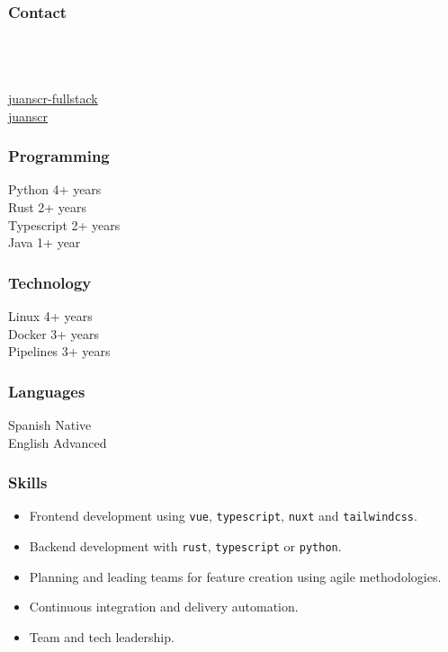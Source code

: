 \documentclass[11pt,a4paper]{article}
\begin{document}
{
%
\sloppy
%
\subsubsection*{Contact}
%
{\Large\faPhone} \myphone \vspace{0.3cm} \\
%
{\Large\faHome} \myhome \vspace{0.3cm} \\
%
{\Large\faAt} \myemail \vspace{0.3cm} \\
%
{\Large\faLinkedin}
\href{https://www.linkedin.com/in/juanscr-fullstack}{juanscr-fullstack}
\vspace{0.3cm} \\
%
{\large\faGithub}  \href{https://github.com/juanscr}{juanscr}
%
\subsubsection*{Programming}
%
{\Large\faPython} Python \hfill 4+ years \vspace{0.3cm} \\
%
{\Large\faRust} Rust \hfill 2+ years \vspace{0.3cm} \\
%
{\Large\faJs} Typescript \hfill 2+ years \vspace{0.3cm} \\
%
{\Large\faJava} Java \hfill 1+ year
%
\subsubsection*{Technology}
%
{\Large\faLinux} Linux \hfill 4+ years \vspace{0.3cm} \\
%
{\Large\faDocker} Docker \hfill 3+ years \vspace{0.3cm} \\
%
{\Large\faBitbucket} Pipelines \hfill 3+ years
%
\subsubsection*{Languages}
%
Spanish \hfill Native \vspace{0.3cm} \\
%
English \hfill Advanced
%
\subsubsection*{Skills}
%
\begin{itemize}[leftmargin=*]
%
    \item Frontend development using \texttt{vue}, \texttt{typescript},
        \texttt{nuxt} and \texttt{tailwindcss}.
%
    \item Backend development with \texttt{rust}, \texttt{typescript} or
        \texttt{python}.
%
    \item Planning and leading teams for feature creation using agile
        methodologies.
%
    \item Continuous integration and delivery automation.
%
    \item Team and tech leadership.
%
\end{itemize}
%
}
\end{document}
